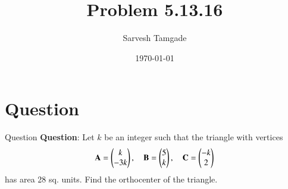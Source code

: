 \documentclass{beamer}
\title{Problem 5.13.16}
\author{Sarvesh Tamgade}
\date{\today}
\numberwithin{equation}{section}
\begin{document}
\begin{frame}
\titlepage
\end{frame}

\section{Question}
\begin{frame}{Question}
\textbf{Question}:
Let \( k \) be an integer such that the triangle with vertices 
\[
\mathbf{A} = \begin{pmatrix} k \\ -3k \end{pmatrix}, \quad 
\mathbf{B} = \begin{pmatrix} 5 \\ k \end{pmatrix}, \quad 
\mathbf{C} = \begin{pmatrix} -k \\ 2 \end{pmatrix}
\]
has area 28 sq. units. Find the orthocenter of the triangle.

\end{frame}
\end{document}
